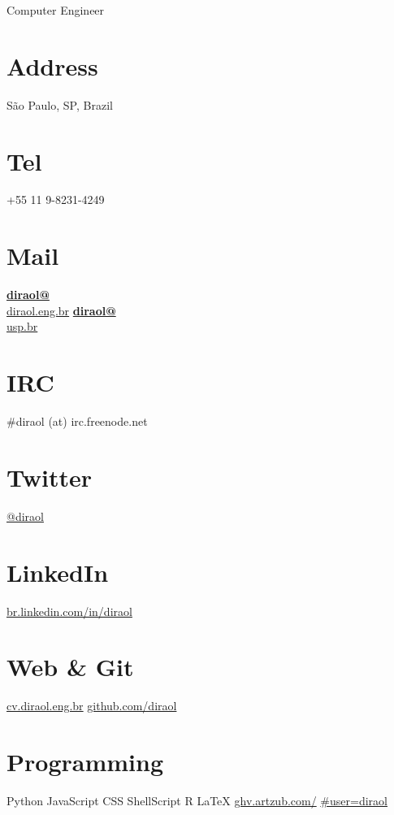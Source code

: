 \documentclass[]{friggeri-cv}
\begin{document}
\thispagestyle{empty}
      {Computer Engineer}
      

\begin{aside}
  \section{Address}
    São Paulo, SP, Brazil
    ~
  \section{Tel}
    +55 11 9-8231-4249
    ~
  \section{Mail}
    \href{mailto:diraol@diraol.eng.br}{\textbf{diraol@}\\diraol.eng.br}
    \href{mailto:diraol@usp.br}{\textbf{diraol@}\\usp.br}
    ~
  \section{IRC}
    \#diraol (at) irc.freenode.net
    ~
  \section{Twitter}
    \href{http://twitter.com/diraol}{@diraol}
    ~
  \section{LinkedIn}
    \href{http://br.linkedin.com/in/diraol}{br.linkedin.com/in/diraol}
    ~
  \section{Web \& Git}
    \href{http://cv.diraol.eng.br}{cv.diraol.eng.br}
    \href{https://github.com/diraol}{github.com/diraol}
    ~
  \section{Programming}
    Python
    JavaScript
    CSS
    ShellScript
    R
    \LaTeX
    \href{http://ghv.artzub.com/\#user=diraol}{ghv.artzub.com/}
    \href{http://ghv.artzub.com/\#user=diraol}{\#user=diraol}
    ~

\end{aside}
\end{document}
